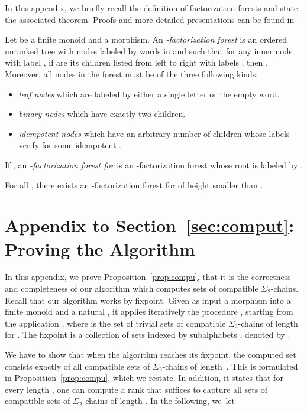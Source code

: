 \documentclass[envcountsame]{llncs}
\newcommand{\sic}[1]{\ensuremath{\Sigma_{#1}}\xspace}
\newcommand\qchains[1]{\ensuremath{\sic{#1}}-chains\xspace}
\newcommand\dchains{\qchains{2}}
\begin{document}
In this appendix, we briefly recall the definition of factorization
forests and state the associated theorem. Proofs and 
more detailed presentations can be found in~\cite{kfacto,bfacto}

Let  be a finite monoid and  a
morphism. An \emph{-factorization forest} is an ordered
unranked tree with nodes labeled by words in  and such that for
any inner node  with label , if  are its children
listed from left to right with labels , then
. Moreover, all nodes  in the forest must be of
the three following kinds:

\begin{itemize}
\item \emph{leaf nodes} which are labeled by either a single letter or
  the empty word.
\item \emph{binary nodes} which have exactly two children.
\item \emph{idempotent nodes} which have an arbitrary number of
  children whose labels  verify  for some idempotent .
\end{itemize}

If , an \emph{-factorization forest for } is an
-factorization forest whose root is labeled by .

\begin{theorem} \label{thm:facto}
  For all , there exists an -factorization forest for
   of height smaller than .
\end{theorem}












\section{Appendix to Section~\ref{sec:comput}: Proving the Algorithm}
\label{app:algo}
In this appendix, we prove Proposition~\ref{prop:compu}, that it is
the correctness and completeness of our algorithm which computes sets
of compatible \dchains. Recall that our algorithm works by
fixpoint. Given as input a morphism  into a
finite monoid  and a natural , it applies iteratively
the procedure , starting from the application , where  is the set of trivial sets of compatible
\dchains of length  for . The fixpoint is a collection of
sets indexed by subalphabets , denoted by . 

We have to show that when the algorithm reaches its fixpoint, the
computed set  consists
exactly of all compatible sets of \dchains of length~. This is
formulated in Proposition~\ref{prop:compu}, which we restate. In
addition, it states that for every length , one can compute a rank
 that suffices to capture all sets of compatible sets of
\dchains of length . In the following, we~let
\end{document}
